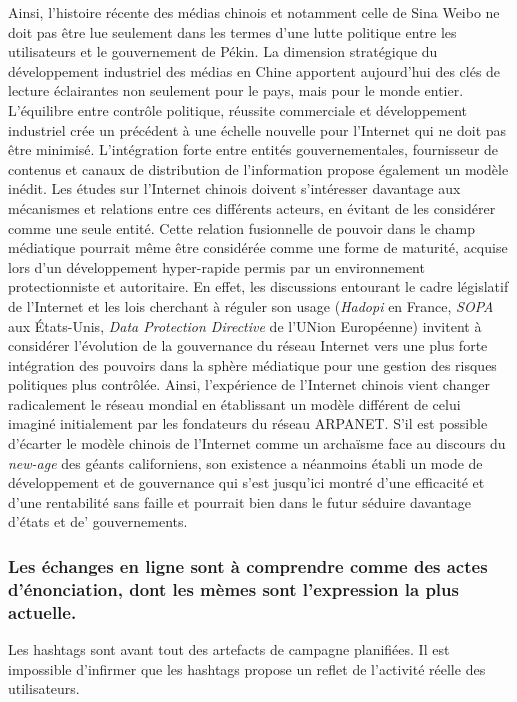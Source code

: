 Ainsi, l'histoire récente des médias chinois et notamment celle de Sina Weibo ne doit pas être lue seulement dans les termes d'une lutte politique entre les utilisateurs et le gouvernement de Pékin. La dimension stratégique du développement industriel des médias en Chine apportent aujourd'hui des clés de lecture éclairantes non seulement pour le pays, mais pour le monde entier. L'équilibre entre contrôle politique, réussite commerciale et développement industriel crée un précédent à une échelle nouvelle pour l'Internet qui ne doit pas être minimisé. L'intégration forte entre entités gouvernementales, fournisseur de contenus et canaux de distribution de l'information propose également un modèle inédit. Les études sur l'Internet chinois doivent s'intéresser davantage aux mécanismes et relations entre ces différents acteurs, en évitant de les considérer comme une seule entité. Cette relation fusionnelle de pouvoir dans le champ médiatique pourrait même être considérée comme une forme de maturité, acquise lors d'un développement hyper-rapide permis par un environnement protectionniste et autoritaire. En effet, les  discussions entourant le cadre législatif de l'Internet et les lois cherchant à réguler son usage (\textit{Hadopi} en France, \textit{SOPA} aux États-Unis, \textit{Data Protection Directive} de l'UNion Européenne) invitent à considérer l'évolution de la gouvernance du réseau Internet vers une plus forte intégration des pouvoirs dans la sphère médiatique pour une gestion des risques politiques plus contrôlée. Ainsi, l'expérience de l'Internet chinois vient changer radicalement le réseau mondial en établissant un modèle différent de celui imaginé initialement par les fondateurs du réseau ARPANET. S'il est possible d'écarter le modèle chinois de l'Internet comme un archaïsme face au discours du \textit{new-age} des géants californiens, son existence a néanmoins établi un mode de développement et de gouvernance qui s'est jusqu'ici montré d'une efficacité et d'une rentabilité sans faille et pourrait bien dans le futur séduire davantage d'états et de' gouvernements.


\subsubsection{Les échanges en ligne sont à comprendre comme des actes d'énonciation, dont les mèmes sont l'expression la plus actuelle.}

Les hashtags sont avant tout des artefacts de campagne planifiées. Il est impossible d{\textquoteright}infirmer que les hashtags propose un reflet de l{\textquoteright}activité réelle des utilisateurs.


